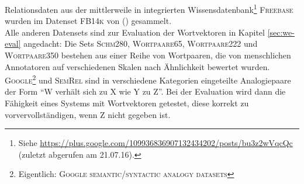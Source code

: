   \begin{table}[h]
    \centering
    \def\arraystretch{1.5}
  \caption[Übersicht über verwendete vorgefertigte Datensets]{Übersicht über in dieser Arbeit verwendete, extern generierte
  Datensets sowie deren Quelle.\label{fig:datasets}}
\end{table}

  Relationsdaten aus der mittlerweile in  integrierten Wissensdatenbank\footnote{Siehe
  \url{https://plus.google.com/109936836907132434202/posts/bu3z2wVqcQc} (zuletzt abgerufen am 21.07.16).}
   \textsc{Freebase} wurden im Datenset \textsc{FB14k} von (\cite{bordes2013translating}) gesammelt.\\

  Alle anderen Datensets sind zur Evaluation der Wortvektoren in Kapitel \ref{sec:we-eval} angedacht: Die Sets
  \textsc{Schm280}, \textsc{Wortpaare65}, \textsc{Wortpaare222} und \textsc{Wortpaare350} bestehen aus einer Reihe
  von Wortpaaren, die von menschlichen Annotatoren auf verschiedenen Skalen nach Ähnlichkeit bewertet wurden.\\
  \textsc{Google}\footnote{Eigentlich: \textsc{Google semantic/syntactic analogy datasets}} und \textsc{SemRel} sind
  in verschiedene Kategorien eingeteilte Analogiepaare der Form ``W verhält sich zu X wie Y zu Z''. Bei der Evaluation
  wird dann die Fähigkeit eines Systems mit Wortvektoren getestet, diese korrekt zu vorvervollständigen, wenn Z nicht
  gegeben ist.


